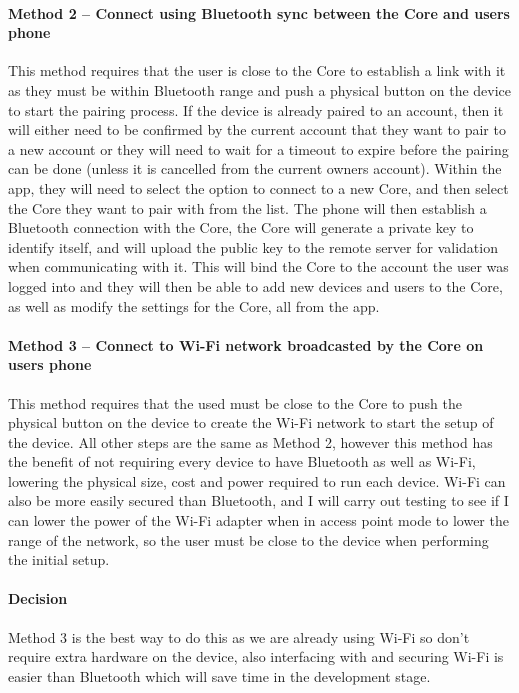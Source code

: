 \paragraph{Method 2 – Connect using Bluetooth sync between the Core and users phone}
This method requires that the user is close to the Core to establish a link with it as they must be within Bluetooth range and push a physical button on the device to start the pairing process. If the device is already paired to an account, then it will either need to be confirmed by the current account that they want to pair to a new account or they will need to wait for a timeout to expire before the pairing can be done (unless it is cancelled from the current owners account). Within the app, they will need to select the option to connect to a new Core, and then select the Core they want to pair with from the list. The phone will then establish a Bluetooth connection with the Core, the Core will generate a private key to identify itself, and will upload the public key to the remote server for validation when communicating with it. This will bind the Core to the account the user was logged into and they will then be able to add new devices and users to the Core, as well as modify the settings for the Core, all from the app.

\paragraph{Method 3 – Connect to Wi-Fi network broadcasted by the Core on users phone}
This method requires that the used must be close to the Core to push the physical button on the device to create the Wi-Fi network to start the setup of the device. All other steps are the same as Method 2, however this method has the benefit of not requiring every device to have Bluetooth as well as Wi-Fi, lowering the physical size, cost and power required to run each device. Wi-Fi can also be more easily secured than Bluetooth, and I will carry out testing to see if I can lower the power of the Wi-Fi adapter when in access point mode to lower the range of the network, so the user must be close to the device when performing the initial setup.

\paragraph{Decision}
Method 3 is the best way to do this as we are already using Wi-Fi so don't require extra hardware on the device, also interfacing with and securing Wi-Fi is easier than Bluetooth which will save time in the development stage. 

